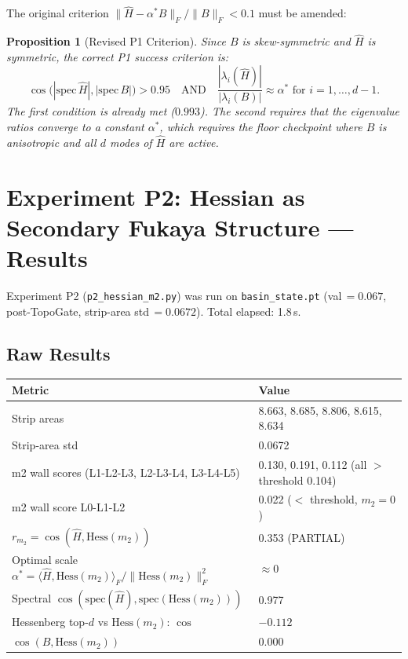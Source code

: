 \documentclass[11pt]{amsart}
\newtheorem{proposition}[theorem]{Proposition}
\begin{document}
The original criterion $\|\hat{H} - \alpha^* B\|_F / \|B\|_F < 0.1$
must be amended:

\begin{proposition}[Revised P1 Criterion]
\label{prop:p1_criterion}
Since $B$ is skew-symmetric and $\hat{H}$ is symmetric, the correct
P1 success criterion is:
\[
  \cos\bigl(|\mathrm{spec}\,\hat{H}|, |\mathrm{spec}\,B|\bigr) > 0.95
  \quad\text{AND}\quad
  \frac{|\lambda_i(\hat{H})|}{|\lambda_i(B)|} \approx \alpha^*
  \text{ for } i = 1,\ldots,d-1.
\]
The first condition is already met ($0.993$).
The second requires that the eigenvalue ratios converge to a constant
$\alpha^*$, which requires the floor checkpoint where $B$ is
anisotropic and all $d$ modes of $\hat{H}$ are active.
\end{proposition}

\section{Experiment P2: Hessian as Secondary Fukaya Structure --- Results}
\label{sec:p2_results}

Experiment P2 (\texttt{p2\_hessian\_m2.py}) was run on
\texttt{basin\_state.pt} (val\,$=0.067$, post-TopoGate,
strip-area std\,$=0.0672$).
Total elapsed: 1.8\,s.

\subsection{Raw Results}

\begin{center}
\small
\begin{tabular}{@{}ll@{}}
\toprule
Metric & Value \\
\midrule
Strip areas & 8.663, 8.685, 8.806, 8.615, 8.634 \\
Strip-area std & 0.0672 \\
m2 wall scores (L1-L2-L3, L2-L3-L4, L3-L4-L5) & 0.130, 0.191, 0.112 (all $>$ threshold 0.104) \\
m2 wall score L0-L1-L2 & 0.022 ($<$ threshold, $m_2=0$) \\
$r_{m_2} = \cos(\hat{H}, \mathrm{Hess}(m_2))$ & 0.353 (PARTIAL) \\
Optimal scale $\alpha^* = \langle\hat{H}, \mathrm{Hess}(m_2)\rangle_F / \|\mathrm{Hess}(m_2)\|_F^2$ & $\approx 0$ \\
Spectral $\cos(\mathrm{spec}(\hat{H}), \mathrm{spec}(\mathrm{Hess}(m_2)))$ & 0.977 \\
Hessenberg top-$d$ vs $\mathrm{Hess}(m_2)$: $\cos$ & $-0.112$ \\
$\cos(B, \mathrm{Hess}(m_2))$ & 0.000 \\
\bottomrule
\end{tabular}
\end{center}
\end{document}
